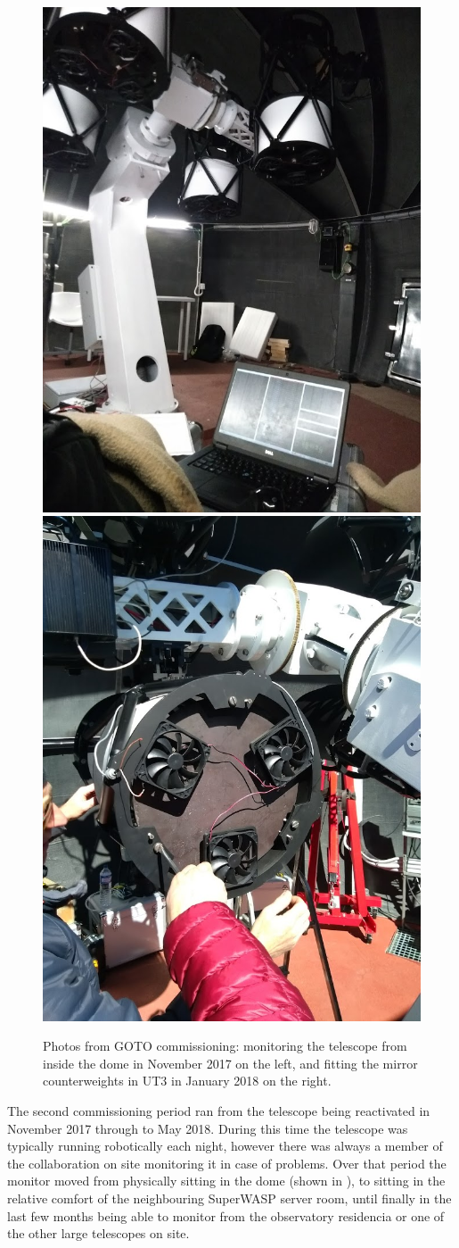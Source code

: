 \begin{colsection}
\begin{figure}[t]
    \begin{center}
        \includegraphics[width=0.4\linewidth]{images/commissioning_photo.jpg}
        \includegraphics[width=0.4\linewidth]{images/commissioning_photo3.jpg}
    \end{center}
    \caption[Photos from GOTO commissioning]{
        Photos from GOTO commissioning: monitoring the telescope from inside the dome in November 2017 on the left, and fitting the mirror counterweights in UT3 in January 2018 on the right.
    }\label{fig:commissioning}
\end{figure}

The second commissioning period ran from the telescope being reactivated in November 2017 through to May 2018. During this time the telescope was typically running robotically each night, however there was always a member of the collaboration on site monitoring it in case of problems. Over that period the monitor moved from physically sitting in the dome (shown in ), to sitting in the relative comfort of the neighbouring SuperWASP server room, until finally in the last few months being able to monitor from the observatory residencia or one of the other large telescopes on site.


\end{colsection}
